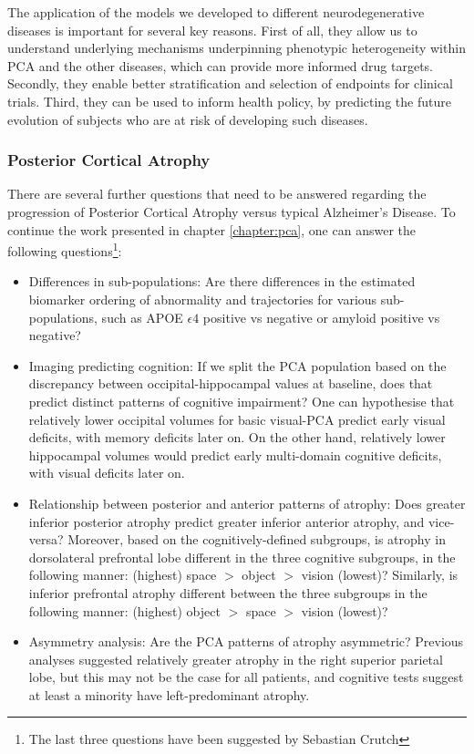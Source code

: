 The application of the models we developed to different neurodegenerative diseases is important for several key reasons. First of all, they allow us to understand underlying mechanisms underpinning phenotypic heterogeneity within PCA and the other diseases, which can provide more informed drug targets. Secondly, they enable better stratification and selection of endpoints for clinical trials. Third, they can be used to inform health policy, by predicting the future evolution of subjects who are at risk of developing such diseases. 

\subsubsection{Posterior Cortical Atrophy}
\label{sec:conTyp}

There are several further questions that need to be answered regarding the progression of Posterior Cortical Atrophy versus typical Alzheimer's Disease. To continue the work presented in chapter \ref{chapter:pca}, one can answer the following questions\footnote{The last three questions have been suggested by Sebastian Crutch}:
\begin{itemize}
 \item Differences in sub-populations: Are there differences in the estimated biomarker ordering of abnormality and trajectories for various sub-populations, such as APOE $\epsilon4$ positive vs negative or amyloid positive vs negative?
 \item Imaging predicting cognition: If we split the PCA population based on the discrepancy between occipital-hippocampal values at baseline, does that predict distinct patterns of cognitive impairment? One can hypothesise that relatively lower occipital volumes for basic visual-PCA predict early visual deficits, with memory deficits later on. On the other hand, relatively lower hippocampal volumes would predict early multi-domain cognitive deficits, with visual deficits later on.
 \item Relationship between posterior and anterior patterns of atrophy: Does greater inferior posterior atrophy predict greater inferior anterior atrophy, and vice-versa? Moreover, based on the cognitively-defined subgroups, is atrophy in dorsolateral prefrontal lobe different in the three cognitive subgroups, in the following manner: (highest) space $>$ object $>$ vision (lowest)? Similarly, is inferior prefrontal atrophy different between the three subgroups in the following manner: (highest) object $>$ space $>$ vision (lowest)?
 \item Asymmetry analysis: Are the PCA patterns of atrophy asymmetric? Previous analyses suggested relatively greater atrophy in the right superior parietal lobe, but this may not be the case for all patients, and cognitive tests suggest at least a minority have left-predominant atrophy.
\end{itemize}

